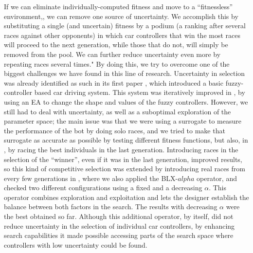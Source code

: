 \documentclass[10pt,journal,compsoc]{IEEEtran}
\begin{document}
	If we can eliminate individually-computed fitness and move to a ``fitnessless'' environment,, we can remove one source of uncertainty. We accomplish this by substituting a single (and uncertain) fitness  by a podium (a ranking after several races against other opponents) 
	in which car controllers that win the most races will proceed to the next generation, while those that do not, will simply be removed from the pool. We can further reduce uncertainty even more by repeating
	races several times."
By doing this, we try to overcome one of the biggest
challenges we have found in this line of research. Uncertainty in
selection was already identified as such in its first paper
\cite{salem_evo17}, which introduced a basic
fuzzy-controller based car driving
system. This system was iteratively improved in
\cite{salem_evo18,salem_cig2018}, by using an EA to change the shape
and values of the fuzzy controllers. However, we still had to deal
with uncertainty, as well as a suboptimal exploration of the parameter
space; the main issue was that we were using a surrogate
to measure the performance of the bot by doing solo
races, and we tried to make that surrogate as accurate as
  possible by testing different
fitness functions, but also, in \cite{salem_cig2018}, by racing the best individuals in the last
generation. Introducing
races in the selection of the ``winner'', even if it was in the last
generation, improved results, so this kind of competitive selection
was extended by introducing real races from every few generations in
\cite{DBLP:conf/cig/SalemMG19}, where we also applied the BLX-$alpha$
operator, and checked two different configurations using a fixed and a
decreasing $\alpha$. This operator combines exploration and
exploitation and lets the designer establish the balance between both factors in the search. The
results with decreasing $\alpha$ were the best obtained so
far. Although this additional operator, by itself, did
  not reduce uncertainty in the selection of individual car
  controllers, by enhancing search capabilities it made possible
  accessing parts of the search space where controllers with low
  uncertainty could be found.
\end{document}
